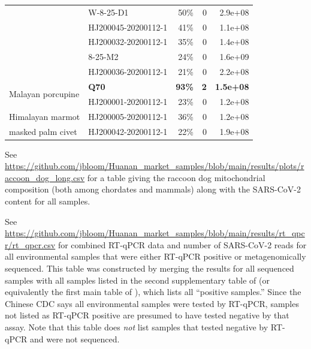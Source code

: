 \documentclass[9pt,twocolumn,twoside]{gsajnl_modified}
\begin{document}
\begin{table}
{\begin{tabular}{llrrr}
                  & W-8-25-D1 &                                       50\% &                        0 &                   2.9e+08 \\
                  & HJ200045-20200112-1 &                                       41\% &                        0 &                   1.1e+08 \\
                  & HJ200032-20200112-1 &                                       35\% &                        0 &                   1.4e+08 \\
                  & 8-25-M2 &                                       24\% &                        0 &                   1.6e+09 \\
                  & HJ200036-20200112-1 &                                       21\% &                        0 &                   2.2e+08 \\
\cline{1-5}
\multirow{2}{*}{Malayan porcupine} & {\bf Q70} &                                      {\bf 93\%} &                       {\bf 2} &                  {\bf 1.5e+08} \\
                  & HJ200001-20200112-1 &                                       23\% &                        0 &                   1.2e+08 \\
\cline{1-5}
Himalayan marmot & HJ200005-20200112-1 &                                       36\% &                        0 &                   1.2e+08 \\
\cline{1-5}
masked palm civet & HJ200042-20200112-1 &                                       22\% &                        0 &                   1.9e+08 \\
\bottomrule
\end{tabular}
}
\end{table}

\begin{table}
\caption{
See \url{https://github.com/jbloom/Huanan_market_samples/blob/main/results/plots/raccoon_dog_long.csv} for a table giving the raccoon dog mitochondrial composition (both among chordates and mammals) along with the SARS-CoV-2 content for all samples.
\label{tab:raccoon_dog_long}
}
\end{table}


\begin{table}
\caption{
See \url{https://github.com/jbloom/Huanan_market_samples/blob/main/results/rt_qpcr/rt_qpcr.csv} for combined RT-qPCR data and number of SARS-CoV-2 reads for all environmental samples that were either RT-qPCR positive or metagenomically sequenced.
This table was constructed by merging the results for all sequenced samples with all samples listed in the second supplementary table of \citet{liu2023surveillance} (or equivalently the first main table of \citet{liu2022surveillance}), which lists all ``positive samples.''
Since the Chinese CDC says all environmental samples were tested by RT-qPCR, samples not listed as RT-qPCR positive are presumed to have tested negative by that assay.
Note that this table does \emph{not} list samples that tested negative by RT-qPCR and were not sequenced.
\label{tab:rt-qpcr}
}
\end{table}
\end{document}
